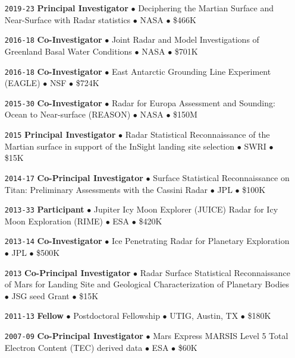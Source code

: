 \begin{itemize}[leftmargin=5.8em, labelsep=1.5em]
    \item[\texttt{2019-23}] \textbf{Principal Investigator} $\bullet$ Deciphering the Martian Surface and Near-Surface with Radar statistics $\bullet$ NASA $\bullet$ \$466K
    
    \item[\texttt{2016-18}] \textbf{Co-Investigator} $\bullet$ Joint Radar and Model Investigations of Greenland Basal Water Conditions $\bullet$ NASA $\bullet$ \$701K
    
    \item[\texttt{2016-18}] \textbf{Co-Investigator} $\bullet$ East Antarctic Grounding Line Experiment (EAGLE) $\bullet$ NSF $\bullet$ \$724K
    
    \item[\texttt{2015-30}] \textbf{Co-Investigator} $\bullet$ Radar for Europa Assessment and Sounding: Ocean to Near-surface (REASON) $\bullet$ NASA $\bullet$ \$150M
    
    \item[\texttt{2015}] \textbf{Principal Investigator} $\bullet$ Radar Statistical Reconnaissance of the Martian surface in support of the InSight landing site selection $\bullet$ SWRI $\bullet$ \$15K
    
    \item[\texttt{2014-17}] \textbf{Co-Principal Investigator} $\bullet$ Surface Statistical Reconnaissance on Titan: Preliminary Assessments with the Cassini Radar $\bullet$ JPL $\bullet$ \$100K
    
    \item[\texttt{2013-33}] \textbf{Participant} $\bullet$ Jupiter Icy Moon  Explorer (JUICE) Radar for Icy Moon Exploration (RIME) $\bullet$ ESA $\bullet$ \$420K
    
    \item[\texttt{2013-14}] \textbf{Co-Investigator} $\bullet$ Ice Penetrating Radar for Planetary Exploration $\bullet$ JPL $\bullet$ \$500K
    
    \item[\texttt{2013}] \textbf{Co-Principal Investigator} $\bullet$ Radar Surface Statistical Reconnaissance of Mars for Landing Site and Geological Characterization of Planetary Bodies $\bullet$ JSG seed Grant $\bullet$ \$15K
    
    \item[\texttt{2011-13}] \textbf{Fellow} $\bullet$ Postdoctoral Fellowship $\bullet$ UTIG, Austin, TX $\bullet$ \$180K
    
    \item[\texttt{2007-09}] \textbf{Co-Principal Investigator} $\bullet$ Mars Express MARSIS Level 5 Total Electron Content (TEC) derived data $\bullet$ ESA $\bullet$ \$60K


\end{itemize}
